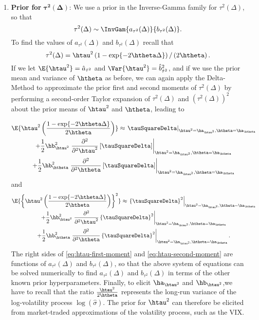 \begin{enumerate}
\item{\textbf{Prior for} $\boldsymbol{\tau^2}(\boldsymbol{\Delta})$:} We use a prior in the Inverse-Gamma family for $\tau^2(\Delta)$, so that
$$
\tau^2(\Delta) \sim \InvGam{ a_{\tau^2}(\Delta)}{b_{\tau^2}(\Delta) }.
$$
To find the values of $a_{\tau^2}(\Delta)$ and $b_{\tau^2}(\Delta)$ recall that
\[\tau^2(\Delta) = \htau^2 \left( 1 - \exp\{ -2\htheta \Delta \}
  \right)/ \left( 2\htheta \right).\]
If we let $\E{\htau^2} = \hat{a}_{\hat{\tau}^2}$ and
$\Var{\htau^2} = \hat{b}^2_{\hat{\tau}^2}$, and if we use the prior
mean and variance of $\htheta$ as before, we can again apply the
Delta-Method to approximate the prior first and second moments of
$\tau^2(\Delta)$ by performing a second-order Taylor expansion of
$\tau^2(\Delta)$ and $(\tau^2(\Delta))^2$ about the prior means of
$\htau^2$ and $\htheta$, leading to

\begin{multline} \label{eq:htau-first-moment}
\E{\htau^2 \left( \frac{1 - \exp\{ -2\htheta \Delta  \}}{2\htheta} \right)} \approx  \left. \tauSquareDelta \right|_{\htau^2 =  \ha_{\htau^2}, \htheta = \ha_{\htheta}}   \\
%
+  \frac{1}{2} \hb^2_{\htau^2}  \left. \frac{\partial^2}{\partial^2 \htau^2} \left[ \tauSquareDelta \right] \right|_{\htau^2 = \ha_{\htau^2}, \htheta = \ha_{\htheta}}   \\
+  \frac{1}{2} \hb^2_{\htheta}  \left. \frac{\partial^2}{\partial^2 \htheta} \left[ \tauSquareDelta \right] \right|_{\htau^2 = \ha_{\htau^2}, \htheta = \ha_{\htheta}}
\end{multline}
and
\begin{multline}  \label{eq:htau-second-moment}
\E{\left\{\htau^2 \left( \frac{1 - \exp\{ -2\htheta \Delta \}}{2\htheta} \right) \right\}^2} \approx  \left. \left\{ \tauSquareDelta\right\}^2 \right|_{\htau^2 = \ha_{\htau^2}, \htheta = \ha_{\htheta}}   \\
%
+  \frac{1}{2} \hb^2_{\htau^2}   \left. \frac{\partial^2}{\partial^2 \htau^2} \left\{ \tauSquareDelta \right\}^2 \right|_{\htau^2 = \ha_{\htau^2}, \htheta = \ha_{\htheta}}  \\
%
+  \frac{1}{2} \hb^2_{\htheta}   \left. \frac{\partial^2}{\partial^2 \htheta} \left\{ \tauSquareDelta \right\}^2 \right|_{\htau^2 = \ha_{\htau^2}, \htheta = \ha_{\htheta}}    .
\end{multline}
The right sides of \eqref{eq:htau-first-moment} and \eqref{eq:htau-second-moment} are functions of $a_{\tau^2}(\Delta)$ and $b_{\tau^2}(\Delta)$, so that the above system of equations can be solved numerically to find $a_{\tau^2}(\Delta)$ and $b_{\tau^2}(\Delta)$ in terms of the other known prior hyperparameters. Finally, to elicit $\ha_{\htau^2}$ and $\hb_{\htau^2}$,we have to recall that the ratio $\frac{\htau^2}{2\htheta}$ represents the long-run variance of the log-volatility process $\log(\hat{\sigma})$. The prior for $\htau^2$ can therefore be elicited from market-traded approximations of the volatility process, such as the VIX.



\end{enumerate}
